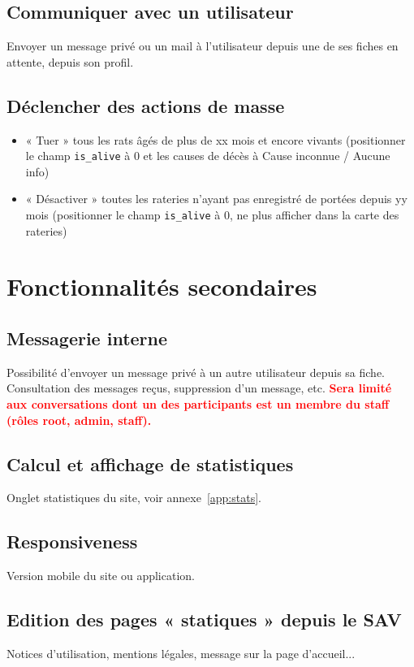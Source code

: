 \documentclass[a4paper,10pt]{article}
\newcommand\desire[1]{\noindent\textbf{\textcolor{red}{#1}}}
\begin{document}
\subsection{Communiquer avec un utilisateur}
Envoyer un message privé ou un mail à l'utilisateur depuis une de ses fiches en attente, depuis son profil.

\subsection{Déclencher des actions de masse}
\begin{itemize}
\item « Tuer » tous les rats âgés de plus de xx mois et encore vivants (positionner le champ \texttt{is\_alive} à 0 et les causes de décès à Cause inconnue / Aucune info)
\item « Désactiver » toutes les rateries n'ayant pas enregistré de portées depuis yy mois (positionner le champ \texttt{is\_alive} à 0, ne plus afficher dans la carte des rateries)
\end{itemize}


\section{Fonctionnalités secondaires}
\subsection{Messagerie interne}
Possibilité d'envoyer un message privé à un autre utilisateur depuis sa fiche. Consultation des messages reçus, suppression d'un message, etc. \desire{Sera limité aux conversations dont un des participants est un membre du staff (rôles root, admin, staff).}

\subsection{Calcul et affichage de statistiques}
Onglet statistiques du site, voir annexe~\ref{app:stats}.

\subsection{Responsiveness}
Version mobile du site ou application.

\subsection{Edition des pages « statiques » depuis le SAV}
Notices d'utilisation, mentions légales, message sur la page d'accueil...
\end{document}

